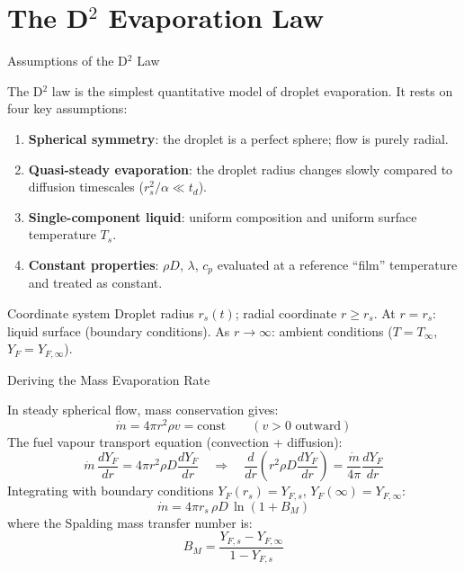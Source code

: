 \documentclass[12pt,aspectratio=169]{beamer}
\newcommand{\mdot}{\dot{m}}
\newcommand{\Ts}{T_s}
\newcommand{\Tinf}{T_\infty}
\newcommand{\Yfs}{Y_{F,s}}
\newcommand{\Yfinf}{Y_{F,\infty}}
\newcommand{\rs}{r_s}
\newcommand{\BM}{B_M}
\begin{document}
\section{The D\texorpdfstring{$^2$}{2} Evaporation Law}

\begin{frame}{Assumptions of the D$^2$ Law}

  The D$^2$ law is the simplest quantitative model of droplet
  evaporation.  It rests on four key assumptions:

  \begin{enumerate}
    \item \textbf{Spherical symmetry}: the droplet is a perfect
          sphere; flow is purely radial.
    \item \textbf{Quasi-steady evaporation}: the droplet radius
          changes slowly compared to diffusion timescales
          ($\rs^2/\alpha \ll t_d$).
    \item \textbf{Single-component liquid}: uniform composition and
          uniform surface temperature $\Ts$.
    \item \textbf{Constant properties}: $\rho D$, $\lambda$, $c_p$
          evaluated at a reference ``film'' temperature and
          treated as constant.
  \end{enumerate}

  \begin{block}{Coordinate system}
    Droplet radius $\rs(t)$; radial coordinate $r \geq \rs$.
    At $r = \rs$: liquid surface (boundary conditions).
    As $r \to \infty$: ambient conditions
    ($T = \Tinf$, $Y_F = \Yfinf$).
  \end{block}
\end{frame}

\begin{frame}{Deriving the Mass Evaporation Rate}

  In steady spherical flow, mass conservation gives:
  \[
    \mdot = 4\pi r^2 \rho v = \text{const}
    \qquad (v > 0 \text{ outward})
  \]
  The fuel vapour transport equation (convection + diffusion):
  \[
    \mdot\,\frac{dY_F}{dr}
    = 4\pi r^2 \rho D \frac{dY_F}{dr}
    \quad\Rightarrow\quad
    \frac{d}{dr}\!\left(r^2\rho D\frac{dY_F}{dr}\right)
    = \frac{\mdot}{4\pi}\frac{dY_F}{dr}
  \]
  Integrating with boundary conditions $Y_F(\rs) = \Yfs$,
  $Y_F(\infty) = \Yfinf$:
  \[
    \boxed{
      \mdot = 4\pi\rs\,\rho D\,\ln(1 + \BM)
    }
  \]
  where the \alert{Spalding mass transfer number} is:
  \[
    \BM = \frac{\Yfs - \Yfinf}{1 - \Yfs}
  \]
\end{frame}
\end{document}
